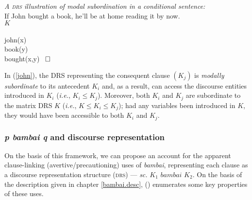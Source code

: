 \ex \textit{A \textsc{drs} illustration of modal subordination in a conditional sentence:} \label{john}\\
If John bought a book, he'll be at home reading it by now.\\
\hspace*{.25\textwidth}$\scriptstyle K $\\
\drs{}
{\\		
	{
		john(x)\\
		book(y)\\
		bought(x,y)
	}
	~$ \boldsymbol{\LARGE\square} $		 
}\xe

\noindent In (\ref{john}), the DRS representing the consequent clause $ (K_j) $ is \textit{modally subordinate} to its antecedent $ K_i $ and, as a result, can access the discourse entities introduced in $ K_i $ (\textit{i.e.}, $ K_i\leqslant K_j $). Moreover, both $K_i$ and $K_j$ are subordinate to the matrix DRS $K$ (\textit{i.e.}, $ K\leqslant K_i\leqslant K_j $); had any variables been introduced in $K$, they would have been accessible to both $K_i$ and $K_j$. 

\subsubsection[Discourse representation of the precautioning construction]{\textit{\textbf{p} bambai \textbf{q}} and discourse representation}



On the basis of this framework, we can propose an account for the apparent clause-linking (avertive/precautioning) uses of \textit{bambai}, representing each clause as a discourse representation structure (\textsc{drs}) --- \textit{sc.} $ \mathit{K_1} \textit{ bambai } \mathit{K_2} $. On the basis of the description given in chapter \ref{bambai.desc}, (\nextx) enumerates some key properties of these uses.

